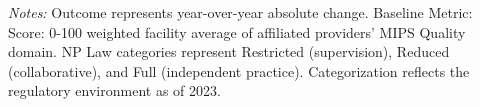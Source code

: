 \begin{table}[htbp]
    \centering
    \caption{Summary of Change in Facility Avg: MIPS Quality by Authority and Year}
    \label{tab:d_fac_mips_quality_score}
    \vspace{0.2cm}
    \vspace{0.1cm}
    \begin{minipage}{\textwidth}
        \footnotesize \textit{Notes:} Outcome represents year-over-year absolute change. Baseline Metric: Score: 0-100 weighted facility average of affiliated providers' MIPS Quality domain. NP Law categories represent Restricted (supervision), Reduced (collaborative), and Full (independent practice). Categorization reflects the regulatory environment as of 2023.
    \end{minipage}
\end{table}
